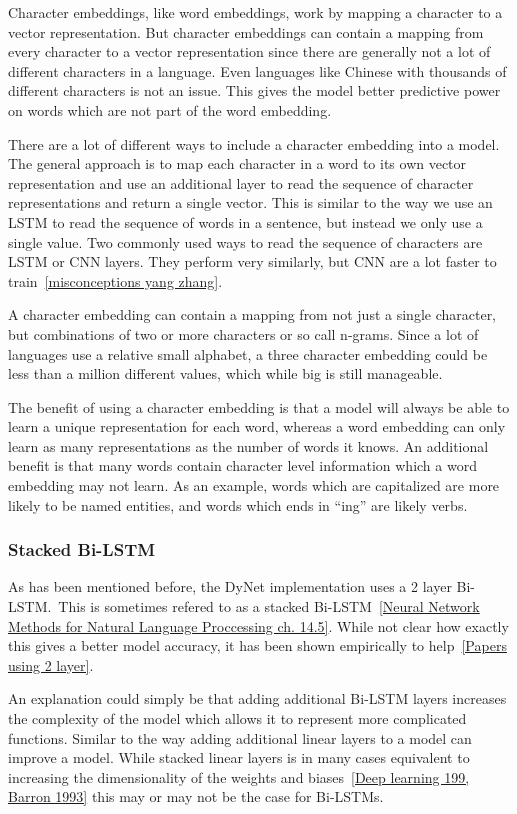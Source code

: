 Character embeddings, like word embeddings, work by mapping a character to a
vector representation. But character embeddings can contain a mapping from every
character to a vector representation since there are generally not a lot of
different characters in a language. Even languages like Chinese with thousands
of different characters is not an issue. This gives the model better predictive
power on words which are not part of the word embedding.

There are a lot of different ways to include a character embedding into a model.
The general approach is to map each character in a word to its own vector
representation and use an additional layer to read the sequence of character
representations and return a single vector. This is similar to the way we use an
LSTM to read the sequence of words in a sentence, but instead we only use a
single value. Two commonly used ways to read the sequence of characters are LSTM
or CNN layers. They perform very similarly, but CNN are a lot faster to
train~\ref{misconceptions yang zhang}.

A character embedding can contain a mapping from not just a single character,
but combinations of two or more characters or so call n-grams. Since a lot of
languages use a relative small alphabet, a three character embedding could be
less than a million different values, which while big is still manageable.

The benefit of using a character embedding is that a model will always be able
to learn a unique representation for each word, whereas a word embedding can
only learn as many representations as the number of words it knows. An
additional benefit is that many words contain character level information which
a word embedding may not learn. As an example, words which are capitalized are
more likely to be named entities, and words which ends in ``ing'' are likely
verbs.

\subsubsection{Stacked Bi-LSTM}

As has been mentioned before, the DyNet implementation uses a 2 layer Bi-LSTM.\
This is sometimes refered to as a stacked Bi-LSTM~\ref{Neural Network Methods
for Natural Language Proccessing ch. 14.5}. While not clear how exactly this
gives a better model accuracy, it has been shown empirically to help~\ref{Papers
using 2 layer}.

An explanation could simply be that adding additional Bi-LSTM layers increases
the complexity of the model which allows it to represent more complicated
functions. Similar to the way adding additional linear layers to a model can
improve a model. While stacked linear layers is in many cases equivalent to
increasing the dimensionality of the weights and biases~\ref{Deep learning 199,
Barron 1993} this may or may not be the case for Bi-LSTMs.

